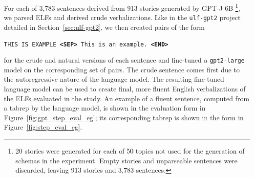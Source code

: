 For each of 3,783 sentences derived from 913 stories generated by GPT-J 6B \footnote{20 stories were generated for each of 50 topics not used for the generation of schemas in the experiment. Empty stories and unparseable sentences were discarded, leaving 913 stories and 3,783 sentences.}, we parsed ELFs and derived crude verbalizations. Like in the \texttt{ulf-gpt2} project detailed in Section~\ref{sec:ulf-gpt2}, we then created pairs of the form \begin{center}
\texttt{THIS IS EXAMPLE \textbf{<SEP>} This is an example. \textbf{<END>}}
\end{center}
for the crude and natural versions of each sentence and fine-tuned a \texttt{gpt2-large} model on the corresponding set of pairs. The crude sentence comes first due to the autoregressive nature of the language model. The resulting fine-tuned language model can be used to create final, more fluent English verbalizations of the ELFs evaluated in the study. An example of a fluent sentence, computed from a tabrep by the language model, is shown in the evaluation form in Figure~\ref{fig:gpt_step_eval_eg}; its corresponding tabrep is shown in the form in Figure~\ref{fig:step_eval_eg}.